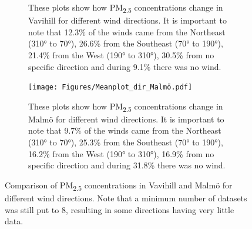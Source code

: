 \begin{figure}[H]
\begin{subfigure}[b]{0.49\textwidth}
        \caption{These plots show how PM\textsubscript{2.5} concentrations change in Vavihill for different wind directions. It is important to note that 12.3\% of the winds came from the Northeast (310° to 70°), 26.6\% from the Southeast (70° to 190°), 21.4\% from the West (190° to 310°), 30.5\% from no specific direction and during 9.1\% there was no wind.}
        \label{fig:Meanplot_dir_Vavihill}
    \end{subfigure}
    \hfill
    \begin{subfigure}[b]{0.49\textwidth}
        \centering
        \texttt{[image: Figures/Meanplot\_dir\_Malmö.pdf]}
        \caption{These plots show how PM\textsubscript{2.5} concentrations change in Malmö for different wind directions. It is important to note that 9.7\% of the winds came from the Northeast (310° to 70°), 25.3\% from the Southeast (70° to 190°), 16.2\% from the West (190° to 310°), 16.9\% from no specific direction and during 31.8\% there was no wind.}
        \label{fig:Meanplot_dir_Malmö}
    \end{subfigure}
    \caption{Comparison of PM\textsubscript{2.5} concentrations in Vavihill and Malmö for different wind directions. Note that a minimum number of datasets was still put to 8, resulting in some directions having very little data. }
    \label{fig:PM25_wind_direction}
\end{figure}

